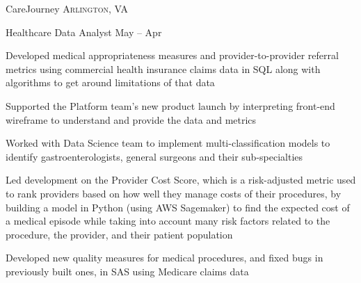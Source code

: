 \documentclass[10pt,a4paper]{article}
\begin{document}
\headedsection
  {{CareJourney}}
  {\textsc{Arlington, VA}} {%
  \headedsubsection
    {Healthcare Data Analyst}
    {May  -- Apr }
    {\begin{list}{--}
      \item Developed medical appropriateness measures and provider-to-provider referral metrics using commercial health insurance claims data in SQL along with algorithms to get around limitations of that data
      \item Supported the Platform team's new product launch by interpreting front-end wireframe to understand and provide the data and metrics
      \item Worked with Data Science team to implement multi-classification models to identify gastroenterologists, general surgeons and their sub-specialties
      \item Led development on the Provider Cost Score, which is a risk-adjusted metric used to rank providers based on how well they manage costs of their procedures, by building a model in Python (using AWS Sagemaker) to find the expected cost of a medical episode while taking into account many risk factors related to the procedure, the provider, and their patient population%
      \item Developed new quality measures for medical procedures, and fixed bugs in previously built ones, in SAS using Medicare claims data
    \end{list}}
}

\end{document}
